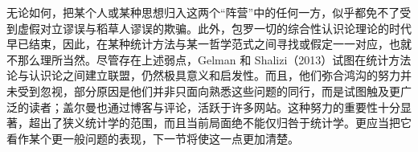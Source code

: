 无论如何，把某个人或某种思想归入这两个“阵营”中的任何一方，似乎都免不了受到虚假对立谬误与稻草人谬误的欺骗。此外，包罗一切的综合性认识论理论的时代早已结束，因此，在某种统计方法与某一哲学范式之间寻找或假定一一对应，也就不那么理所当然。尽管存在上述弱点，Gelman 和 Shalizi（2013）试图在统计方法论与认识论之间建立联盟，仍然极具意义和启发性。而且，他们弥合鸿沟的努力并未受到忽视，部分原因是他们并非只面向熟悉这些问题的同行，而是试图触及更广泛的读者；盖尔曼也通过博客与评论，活跃于许多网站。这种努力的重要性十分显著，超出了狭义统计学的范围，而且当前局面绝不能仅归咎于统计学。更应当把它看作某个更一般问题的表现，下一节将使这一点更加清楚。
